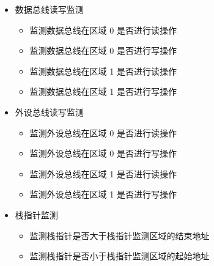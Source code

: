 \documentclass[main\_\_CN.tex]{subfiles}
\begin{document}
\begin{itemize}
    \item 数据总线读写监测
        \begin{itemize}
            \item 监测数据总线在区域 0 是否进行读操作
            \item 监测数据总线在区域 0 是否进行写操作
            \item 监测数据总线在区域 1 是否进行读操作
            \item 监测数据总线在区域 1 是否进行写操作
        \end{itemize}
    \item 外设总线读写监测
        \begin{itemize}
            \item 监测外设总线在区域 0 是否进行读操作
            \item 监测外设总线在区域 0 是否进行写操作
            \item 监测外设总线在区域 1 是否进行读操作
            \item 监测外设总线在区域 1 是否进行写操作
        \end{itemize}
    \item 栈指针监测
        \begin{itemize}
            \item 监测栈指针是否大于栈指针监测区域的结束地址
            \item 监测栈指针是否小于栈指针监测区域的起始地址
        \end{itemize}
\end{itemize}
\end{document}
